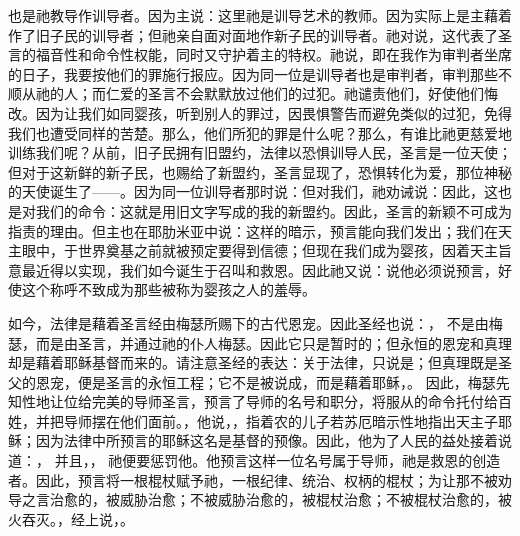 也是祂教导作训导者。因为主说：这里祂是训导艺术的教师。因为实际上是主藉着作了旧子民的训导者；但祂亲自面对面地作新子民的训导者。祂对说，这代表了圣言的福音性和命令性权能，同时又守护着主的特权。祂说，即在我作为审判者坐席的日子，我要按他们的罪施行报应。因为同一位是训导者也是审判者，审判那些不顺从祂的人；而仁爱的圣言不会默默放过他们的过犯。祂谴责他们，好使他们悔改。因为让我们如同婴孩，听到别人的罪过，因畏惧警告而避免类似的过犯，免得我们也遭受同样的苦楚。那么，他们所犯的罪是什么呢？那么，有谁比祂更慈爱地训练我们呢？从前，旧子民拥有旧盟约，法律以恐惧训导人民，圣言是一位天使；但对于这新鲜的新子民，也赐给了新盟约，圣言显现了，恐惧转化为爱，那位神秘的天使诞生了——。因为同一位训导者那时说：但对我们，祂劝诫说：因此，这也是对我们的命令：这就是用旧文字写成的我的新盟约。因此，圣言的新颖不可成为指责的理由。但主也在耶肋米亚中说：这样的暗示，预言能向我们发出；我们在天主眼中，于世界奠基之前就被预定要得到信德；但现在我们成为婴孩，因着天主旨意最近得以实现，我们如今诞生于召叫和救恩。因此祂又说：说他必须说预言，好使这个称呼不致成为那些被称为婴孩之人的羞辱。\par

如今，法律是藉着圣言经由梅瑟所赐下的古代恩宠。因此圣经也说：， 不是由梅瑟，而是由圣言，并通过祂的仆人梅瑟。因此它只是暂时的；但永恒的恩宠和真理却是藉着耶稣基督而来的。请注意圣经的表达：关于法律，只说是；但真理既是圣父的恩宠，便是圣言的永恒工程；它不是被说成，而是藉着耶稣，。 因此，梅瑟先知性地让位给完美的导师圣言，预言了导师的名号和职分，将服从的命令托付给百姓，并把导师摆在他们面前。，他说，，指着农的儿子若苏厄暗示性地指出天主子耶稣；因为法律中所预言的耶稣这名是基督的预像。因此，他为了人民的益处接着说道：， 并且，， 祂便要惩罚他。他预言这样一位名号属于导师，祂是救恩的创造者。因此，预言将一根棍杖赋予祂，一根纪律、统治、权柄的棍杖；为让那不被劝导之言治愈的，被威胁治愈；不被威胁治愈的，被棍杖治愈；不被棍杖治愈的，被火吞灭。，经上说，。\par

